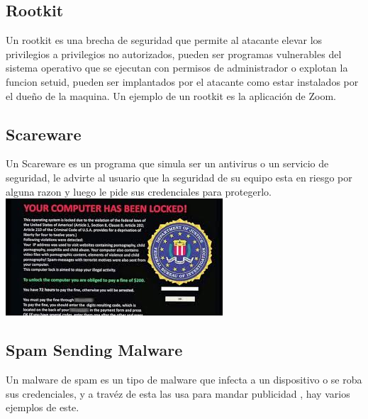 \documentclass[10pt,a4paper]{article} %
\begin{document}
            \subsection{Rootkit}
                Un rootkit es una brecha de seguridad que permite al atacante
                elevar los privilegios a privilegios no autorizados, pueden ser
                programas vulnerables del sistema operativo que se ejecutan con
                permisos de administrador o explotan la funcion setuid, pueden
                ser implantados por el atacante como estar instalados por el
                dueño de la maquina. Un ejemplo de un rootkit es la aplicación de Zoom.

            \subsection{Scareware}
                Un Scareware es un programa que simula ser un antivirus o un
                servicio de seguridad, le advirte al usuario que la seguridad
                de su equipo esta en riesgo por alguna razon y luego le pide
                sus credenciales para protegerlo. 
                \\ \includegraphics[width=1.2\linewidth]{scareware.jpeg}
                \\ 

            \subsection{Spam Sending Malware}
                Un malware de spam es un tipo de malware que infecta a un
                dispositivo o se roba sus credenciales, y a travéz de esta las
                usa para mandar publicidad  , hay varios ejemplos de este.
                
\end{document}

